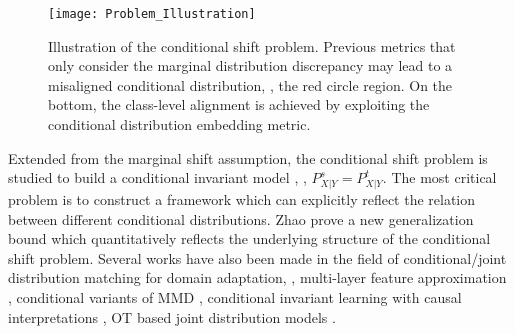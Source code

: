 \documentclass[final]{cvpr}
\begin{document}
\begin{figure}
\centering
\texttt{[image: Problem\_Illustration]}
\caption{Illustration of the conditional shift problem. Previous metrics that only consider the marginal distribution discrepancy may lead to a misaligned conditional distribution, \ie, the red circle region. On the bottom, the class-level alignment is achieved by exploiting the conditional distribution embedding metric.}\label{fig:Problem_Illustration}
\vspace{-10pt}
\end{figure}

Extended from the marginal shift assumption, the conditional shift problem is studied to build a conditional invariant model \cite{zhang2013domain}, \ie, $P_{X|Y}^s=P_{X|Y}^t$. The most critical problem is to construct a framework which can explicitly reflect the relation between different conditional distributions. Zhao \etal \cite{zhao2019learning} prove a new generalization bound which quantitatively reflects the underlying structure of the conditional shift problem. Several works have also been made in the field of conditional/joint distribution matching for domain adaptation, \eg, multi-layer feature approximation \cite{Long2017Deep}, conditional variants of MMD \cite{kang2020contrastive,li2020maximum,zhu2020deep}, conditional invariant learning with causal interpretations \cite{gong2016domain,ren2018generalized}, OT based joint distribution models \cite{bhushan2018deepjdot,courty2017joint}.


\end{document}
